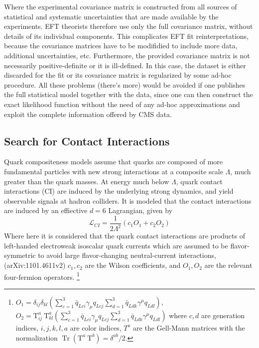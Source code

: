 Where the experimental covariance matrix is constructed from all sources of statistical and
systematic uncertainties that are made available by the experiments. EFT theorists therefore use only the full covariance matrix, without details of its individual components. This complicates EFT fit reinterpretations, because the covariance matrices have to be modifidied to include more data, additional uncertainties, etc. Furthermore, the provided covariance matrix is not necessarily positive-definite or it is ill-defined. In this case, the dataset is either discarded for the fit or its covariance matrix is regularized by some ad-hoc procedure. All these problems (there's more) would be avoided if one publishes the full statistical model together with the data, since one can then construct the exact likelihood function without the need of any ad-hoc approximations and exploit the complete information offered by CMS data.

\subsection{Search for Contact Interactions}

Quark compositeness models assume that quarks are composed of more fundamental particles with new strong interactions at a composite scale $\Lambda$, much greater than the quark masses. At energy much below $\Lambda$, quark contact interactions (CI) are induced by the underlying strong dynamics, and yield observable signals at hadron colliders. It is modeled that the contact interactions are induced by an effiective $d=6$ Lagrangian, given by
\begin{equation}
    \mathcal{L}_{CI}=\frac{1}{2 \Lambda^{2}}\left(c_{1} O_{1}+c_{2} O_{2}\right)
\end{equation}
Where here it is considered that the quark contact interactions are products of left-handed electroweak isoscalar quark currents which are assumed to be flavor-symmetric to avoid large flavor-changing neutral-current interactions, (arXiv:1101.4611v2) $c_1, c_2$ are the Wilson coefficients, and $O_1, O_2$ are the relevant four-fermion operators. 
\footnote{$O_{1}=\delta_{i j} \delta_{k l}\left(\sum_{c=1}^{3} \bar{q}_{L c i} \gamma_{\mu} q_{L c j} \sum_{d=1}^{3} \bar{q}_{L d k} \gamma^{\mu} q_{L d l}\right)$,  $O_{2}=\mathrm{T}_{i j}^{a} \mathrm{~T}_{k l}^{a}\left(\sum_{c=1}^{3} \bar{q}_{L c i} \gamma_{\mu} q_{L c j} \sum_{d=1}^{3} \bar{q}_{L d k} \gamma^{\mu} q_{L d l}\right)$ where $c,d$ are generation indices, $i, j, k, l, a$ are color indices, $T^a$ are the Gell-Mann matrices with the normalization $\operatorname{Tr}\left(\mathrm{T}^{a} \mathrm{~T}^{b}\right)=\delta^{a b} / 2$.}


